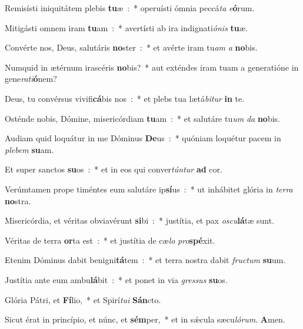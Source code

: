 \item Remisísti iniquitátem plebis \textbf{tu}æ~:~* operuísti ómnia peccá\emph{ta} \emph{e}\textbf{ó}rum.
\item Mitigásti omnem iram \textbf{tu}am~:~* avertísti ab ira indignati\emph{ó}\emph{nis} \textbf{tu}æ.
\item Convérte nos, Deus, salutáris \textbf{no}ster~:~* et avérte iram tu\emph{am} \emph{a} \textbf{no}bis.
\item Numquid in ætérnum irascéris \textbf{no}bis?~* aut exténdes iram tuam a generatióne in gene\emph{ra}\emph{ti}\textbf{ó}nem?
\item Deus, tu convérsus vivifi\textbf{cá}bis nos~:~* et plebs tua lætá\emph{bi}\emph{tur} \textbf{in} te.
\item Osténde nobis, Dómine, misericórdiam \textbf{tu}am~:~* et salutáre tu\emph{um} \emph{da} \textbf{no}bis.
\item Audiam quid loquátur in me Dóminus \textbf{De}us~:~* quóniam loquétur pacem in \emph{ple}\emph{bem} \textbf{su}am.
\item Et super sanctos \textbf{su}os~:~* et in eos qui conver\emph{tún}\emph{tur} \textbf{ad} cor.
\item Verúmtamen prope timéntes eum salutáre ip\textbf{sí}us~:~* ut inhábitet glória in \emph{ter}\emph{ra} \textbf{no}stra.
\item Misericórdia, et véritas obviavérunt \textbf{si}bi~:~* justítia, et pax \emph{o}\emph{scu}\textbf{lá}tæ sunt.
\item Véritas de terra \textbf{or}ta est~:~* et justítia de cæ\emph{lo} \emph{pro}\textbf{spé}xit.
\item Etenim Dóminus dabit benigni\textbf{tá}tem~:~* et terra nostra dabit \emph{fru}\emph{ctum} \textbf{su}um.
\item Justítia ante eum ambu\textbf{lá}bit~:~* et ponet in via \emph{gres}\emph{sus} \textbf{su}os.
\item Glória Pátri, et \textbf{Fí}lio,~* et Spirí\emph{tu}\emph{i} \textbf{Sán}cto.
\item Sicut érat in princípio, et núnc, et \textbf{sém}per,~* et in sǽcula sæcu\emph{ló}\emph{rum}. \textbf{A}men.